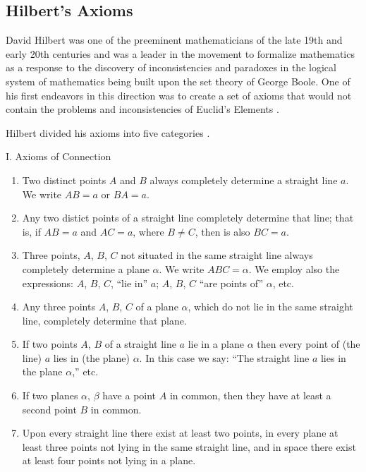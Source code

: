 \documentclass[
]{book}
\theoremstyle{definition}
\theoremstyle{definition}
\theoremstyle{definition}
\theoremstyle{definition}
\theoremstyle{remark}
\begin{document}
\hypertarget{hilberts-axioms}{%
\subsection{Hilbert's Axioms}\label{hilberts-axioms}}

David Hilbert was one of the preeminent mathematicians of the late 19th and early 20th centuries and was a leader in the movement to formalize mathematics as a response to the discovery of inconsistencies and paradoxes in the logical system of mathematics being built upon the set theory of George Boole. One of his first endeavors in this direction was to create a set of axioms that would not contain the problems and inconsistencies of Euclid's Elements \citep{HilbertGeo}.

Hilbert divided his axioms into five categories \citep[p.~3-26]{HilbertGeo}.

I. Axioms of Connection

\begin{enumerate}
\def\labelenumi{\arabic{enumi}.}
\item
  Two distinct points \(A\) and \(B\) always completely determine a straight line \(a\). We write \(AB=a\) or \(BA=a\).
\item
  Any two distict points of a straight line completely determine that line; that is, if \(AB=a\) and \(AC=a\), where \(B\neq C\), then is also \(BC=a\).
\item
  Three points, \(A\), \(B\), \(C\) not situated in the same straight line always completely determine a plane \(\alpha\). We write \(ABC = \alpha\).
  We employ also the expressions: \(A\), \(B\), \(C\), ``lie in'' \(a\); \(A\), \(B\), \(C\) ``are points of'' \(\alpha\), etc.
\item
  Any three points \(A\), \(B\), \(C\) of a plane \(\alpha\), which do not lie in the same straight line, completely determine that plane.
\item
  If two points \(A\), \(B\) of a straight line \(a\) lie in a plane \(\alpha\) then every point of (the line) \(a\) lies in (the plane) \(\alpha\).
  In this case we say: ``The straight line \(a\) lies in the plane \(\alpha\),'' etc.
\item
  If two planes \(\alpha\), \(\beta\) have a point \(A\) in common, then they have at least a second point \(B\) in common.
\item
  Upon every straight line there exist at least two points, in every plane at least three points not lying in the same straight line, and in space there exist at least four points not lying in a plane.
\end{enumerate}
\end{document}
